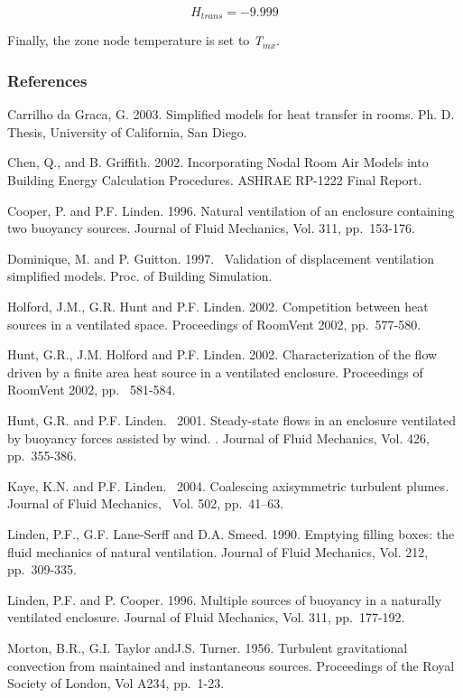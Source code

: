 \begin{equation}
{H_{trans}} =  - 9.999
\end{equation}

Finally, the zone node temperature is set to \emph{T\(_{mx}\)}.

\subsubsection{References}\label{references-2-000}

Carrilho da Graca, G. 2003. Simplified models for heat transfer in rooms. Ph. D. Thesis, University of California, San Diego.

Chen, Q., and B. Griffith. 2002. Incorporating Nodal Room Air Models into Building Energy Calculation Procedures. ASHRAE RP-1222 Final Report.

Cooper, P. and P.F. Linden. 1996. Natural ventilation of an enclosure containing two buoyancy sources. Journal of Fluid Mechanics, Vol. 311, pp.~153-176.

Dominique, M. and P. Guitton. 1997.~ Validation of displacement ventilation simplified models. Proc. of Building Simulation.

Holford, J.M., G.R. Hunt and P.F. Linden. 2002. Competition between heat sources in a ventilated space. Proceedings of RoomVent 2002, pp.~577-580.

Hunt, G.R., J.M. Holford and P.F. Linden. 2002. Characterization of the flow driven by a finite area heat source in a ventilated enclosure. Proceedings of RoomVent 2002, pp.~ 581-584.

Hunt, G.R. and P.F. Linden.~ 2001. Steady-state flows in an enclosure ventilated by buoyancy forces assisted by wind. . Journal of Fluid Mechanics, Vol. 426,~ pp.~355-386.

Kaye, K.N. and P.F. Linden.~ 2004. Coalescing axisymmetric turbulent plumes\emph{.} Journal of Fluid Mechanics, ~Vol. 502, pp.~41--63.

Linden, P.F., G.F. Lane-Serff and D.A. Smeed. 1990. Emptying filling boxes: the fluid mechanics of natural ventilation. Journal of Fluid Mechanics, Vol. 212, pp.~309-335.

Linden, P.F. and P. Cooper. 1996. Multiple sources of buoyancy in a naturally ventilated enclosure. Journal of Fluid Mechanics, Vol. 311, pp.~177-192.

Morton, B.R., G.I. Taylor andJ.S. Turner. 1956. Turbulent gravitational convection from maintained and instantaneous sources. Proceedings of the Royal Society of London, Vol A234, pp.~1-23.

